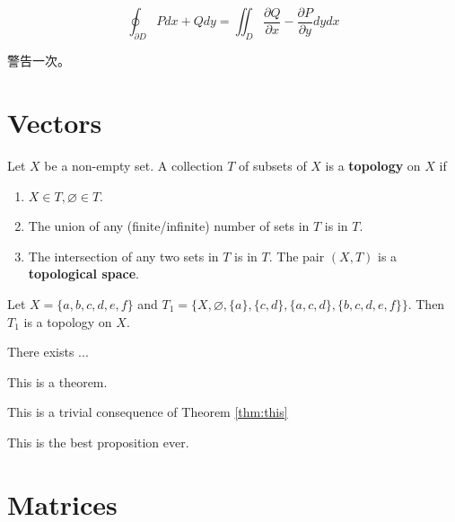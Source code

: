 \documentclass[10pt, twoside]{book}
\begin{document}
\begin{equation}
    \oint_{\partial D} P dx + Q dy = \iint_D \frac{\partial Q}{\partial x} - \frac{\partial P}{\partial y} dy dx
\end{equation}

\begin{remark}
    警告一次。
\end{remark}

\section{Vectors}



\begin{definition}
    Let $X$ be a non-empty set. A collection $T$ of subsets of $X$ is a \textbf{topology} on $X$ if
    \begin{enumerate}
        \item $X\in T, \varnothing \in T$.
        \item The union of any (finite/infinite) number of sets in $T$ is in $T$.
        \item The intersection of any two sets in $T$ is in $T$.
        The pair $(X, T)$ is a \textbf{topological space}.
    \end{enumerate}
\end{definition}

\begin{example}
    Let $X = \{a, b, c, d, e, f\}$ and 
    $T_1 = \{X, \varnothing, \{a\}, \{c, d\}, \{a, c, d\}, \{b, c, d, e, f\}\}$. 
    Then $T_1$ is a topology on $X$.
\end{example}

\begin{lemma}[Zorn's]
    There exists ...
\end{lemma}

\begin{theorem} \label{thm:this}
    This is a theorem.
\end{theorem}

\begin{corollary}
    This is a trivial consequence of Theorem \ref{thm:this}
\end{corollary}

\begin{proposition}
    This is the best proposition ever.
\end{proposition}

\section{Matrices}
\lipsum[4]
\begin{example}
    \lipsum[5]
\end{example}



\end{document}
